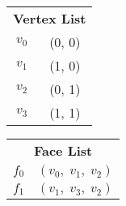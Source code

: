\begin{figure}[!ht]
    \centering

    \vspace{0.5em}
    \begin{subfigure}{.25\textwidth}
        \centering

        \renewcommand{\arraystretch}{1.1}
        \begin{tabular}{ c|c| }
            \multicolumn{2}{c}{\bfseries\footnotesize\hspace{18pt} Vertex List} \\
            \cline{2-2}%
            $ v_0 $ & (0, 0) \\
            \cline{2-2}%
            $ v_1 $ & (1, 0) \\
            \cline{2-2}%
            $ v_2 $ & (0, 1) \\
            \cline{2-2}%
            $ v_3 $ & (1, 1) \\
            \cline{2-2}%
        \end{tabular}

        \vspace{3em}
        \caption{}
    \end{subfigure}%
    \begin{subfigure}{.25\textwidth}
        \centering

        \renewcommand{\arraystretch}{1.2}
        \begin{tabular}{ c|c| }
            \multicolumn{2}{c}{\bfseries\footnotesize\hspace{18pt} Face List} \\
            \cline{2-2}%
            $ f_0 $ & $ ( v_0, \; v_1, \; v_2 ) $ \\
            \cline{2-2}%
            $ f_1 $ & $ ( v_1, \; v_3, \; v_2 ) $ \\
            \cline{2-2}%
        \end{tabular}
        \vspace{29pt}

        \vspace{3em}
        \caption{}
    \end{subfigure}%
    \begin{subfigure}{.35\textwidth}
        \centering
        

\end{subfigure}
\end{figure}

